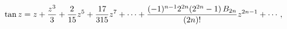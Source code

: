 \[\mathop{\tan\/}\nolimits z=z+\frac{z^{3}}{3}+\frac{2}{15}z^{5}+\frac{17}{315}z%
^{7}+\cdots+\frac{(-1)^{n-1}2^{2n}(2^{2n}-1)\mathop{B_{2n}\/}\nolimits}{(2n)!}%
z^{2n-1}+\cdots,\]